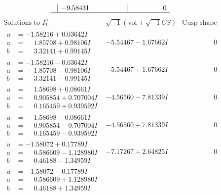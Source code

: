 \documentclass[1p]{elsarticle_modified}
\theoremstyle{definition}
\newcommand{\I}{\sqrt{-1}}
\begin{document}
$$\begin{array}{c|c|c}
 & -9.58431\phantom{ +0.000000I} & \phantom{-0.000000 } 0\\
 \hline 
 \end{array}$$\newpage$$\begin{array}{c|c|c}  
\text{Solutions to }I^u_{1}& \I (\text{vol} + \sqrt{-1}CS) & \text{Cusp shape}\\
 \hline 
\begin{aligned}
u &= -1.58216 + 0.03642 I \\
a &= \phantom{-}1.85708 + 0.98106 I \\
b &= \phantom{-}3.32141 + 0.99145 I\end{aligned}
 & -5.54467 - 1.67662 I & \phantom{-0.000000 } 0 \\ \hline\begin{aligned}
u &= -1.58216 - 0.03642 I \\
a &= \phantom{-}1.85708 - 0.98106 I \\
b &= \phantom{-}3.32141 - 0.99145 I\end{aligned}
 & -5.54467 + 1.67662 I & \phantom{-0.000000 } 0 \\ \hline\begin{aligned}
u &= \phantom{-}1.58698 + 0.08661 I \\
a &= \phantom{-}0.905854 + 0.707004 I \\
b &= \phantom{-}0.165459 + 0.939592 I\end{aligned}
 & -4.56560 - 7.81339 I & \phantom{-0.000000 } 0 \\ \hline\begin{aligned}
u &= \phantom{-}1.58698 - 0.08661 I \\
a &= \phantom{-}0.905854 - 0.707004 I \\
b &= \phantom{-}0.165459 - 0.939592 I\end{aligned}
 & -4.56560 + 7.81339 I & \phantom{-0.000000 } 0 \\ \hline\begin{aligned}
u &= -1.58072 + 0.17789 I \\
a &= \phantom{-}0.586609 - 1.128980 I \\
b &= \phantom{-}0.46188 - 1.34959 I\end{aligned}
 & -7.17267 + 2.64825 I & \phantom{-0.000000 } 0 \\ \hline\begin{aligned}
u &= -1.58072 - 0.17789 I \\
a &= \phantom{-}0.586609 + 1.128980 I \\
b &= \phantom{-}0.46188 + 1.34959 I\end{aligned}

\end{array}$$
\end{document}

